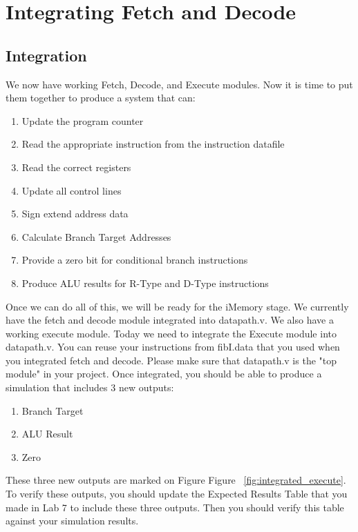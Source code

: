\chapter{Integrating Fetch and Decode}

\section{Integration}
We now have working Fetch, Decode, and Execute modules.  Now it is time to put them together to produce a system that can:
\begin{enumerate}
	\item Update the program counter
	\item Read the appropriate instruction from the instruction datafile
	\item Read the correct registers
	\item Update all control lines
	\item Sign extend address data
	\item Calculate Branch Target Addresses
	\item Provide a zero bit for conditional branch instructions
	\item Produce ALU results for R-Type and D-Type instructions
\end{enumerate}

Once we can do all of this, we will be ready for the iMemory stage.  We currently have the fetch and decode module integrated into datapath.v.  We also have a working execute module.  Today we need to integrate the Execute module into datapath.v.  You can reuse your instructions from fibI.data that you used when you integrated fetch and decode.  Please make sure that datapath.v is the "top module" in your project.  Once integrated, you should be able to produce a simulation that includes 3 new outputs:
\begin{enumerate}
	\item Branch Target
	\item ALU Result
	\item Zero
\end{enumerate}   

These three new outputs are marked on Figure Figure ~\ref{fig:integrated_execute}.  To verify these outputs, you should update the Expected Results Table that you made in Lab 7 to include these three outputs.  Then you should verify this table against your simulation results.

